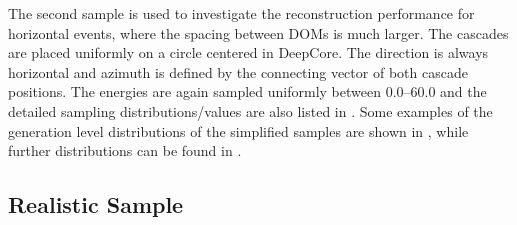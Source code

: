 
The second sample is used to investigate the reconstruction performance for horizontal events, where the spacing between DOMs is much larger. The cascades are placed uniformly on a circle centered in DeepCore. The direction is always horizontal and azimuth is defined by the connecting vector of both cascade positions. The energies are again sampled uniformly between \SIrange[range-phrase={~and~}]{0.0}{60.0}{\gev} and the detailed sampling distributions/values are also listed in . Some examples of the generation level distributions of the simplified samples are shown in , while further distributions can be found in .


\subsection{Realistic Sample}

